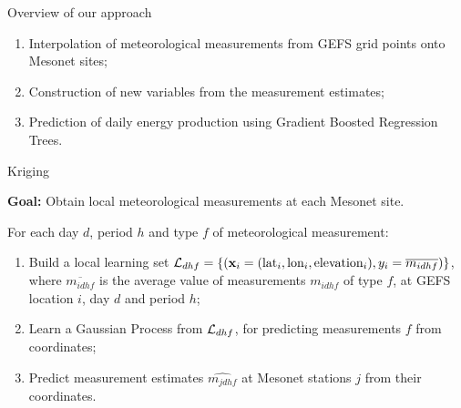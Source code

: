\documentclass[handout]{beamer}
\begin{document}

\begin{frame}{Overview of our approach}

\begin{enumerate}
\item Interpolation of meteorological measurements from GEFS grid points onto Mesonet sites;
\item Construction of new variables from the measurement estimates;
\item Prediction of daily energy production using Gradient Boosted Regression Trees.
\end{enumerate}

\end{frame}



\begin{frame}{Kriging}

\textbf{Goal:} Obtain local meteorological measurements at each Mesonet site.

\vskip0.25cm

For each day $d$, period $h$ and type $f$ of meteorological measurement:

\begin{enumerate}

\item Build a local learning set ${\cal L}_{dhf} = \{ (\mathbf{x}_i = (\text{lat}_i,
\text{lon}_i, \text{elevation}_i), y_i = \overline{m_{idhf}} ) \}$,  where
$\overline{m_{idhf}}$ is the average value of measurements $m_{idhf}$ of type $f$, at GEFS location $i$, day $d$ and period $h$;

\item Learn a Gaussian Process from ${\cal L}_{dhf}$, for predicting measurements $f$ from coordinates;

\item Predict measurement estimates $\widehat{m_{jdhf}}$ at Mesonet stations $j$ from their coordinates.

\end{enumerate}

\end{frame}


\end{document}
